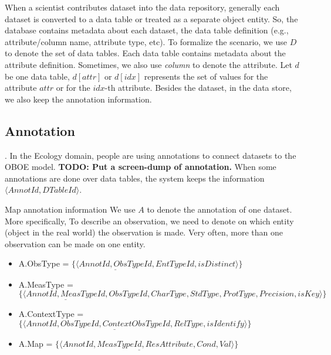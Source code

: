 \documentclass[conference]{IEEEtran}
\newcommand{\from}[2]{{\bf[{\sc from #1:} #2]}}
\begin{document}
When a scientist contributes dataset into the data repository, generally
each dataset is converted to a data table\cite{tdar} or treated as a separate
object entity\cite{knb}. 
So, the database contains metadata about each dataset, the data table
definition (e.g., attribute/column name, attribute type, etc). 
To formalize the scenario, we use $D$ to denote the set of data
tables. Each data table contains metadata about the attribute
definition.  Sometimes, we also use {\em column} to denote the attribute. 
Let $d$ be one data table, 
$d[attr]$ or $d[idx]$ represents the set of values for the attribute
$attr$ or for the $idx$-th attribute. 
Besides the dataset, in the data store, we also keep the annotation
information. 

\subsection{Annotation}\label{sec:annotation}.
In the Ecology domain, people are using annotations to connect
datasets to the OBOE model. 
{\bf TODO: Put a screen-dump of annotation.}
When some annotations are done over data tables, the system keeps the
information $\langle AnnotId, DTableId\rangle$.

Map annotation information 
We use $A$ to denote the annotation of one dataset. 
More specifically,
To describe an observation, we need to denote on which entity (object in the
real world) the observation is made.
Very often, more than one observation can be made on one entity.   
\begin{itemize}
\item A.ObsType = $\{\langle \underline{AnnotId,ObsTypeId}, EntTypeId,
  isDistinct \rangle\}$ 
\item A.MeasType = $\{\langle \underline{AnnotId, MeasTypeId}, ObsTypeId,
  CharType, StdType, ProtType, Precision, isKey \rangle\}$ 
\item A.ContextType = $\{\langle \underline{AnnotId, ObsTypeId, ContextObsTypeId, RelType}, isIdentify\rangle\}$
\item A.Map = $\{\langle \underline{AnnotId,MeasTypeId, ResAttribute, Cond}, Val\rangle\}$
\end{itemize}
\end{document}
